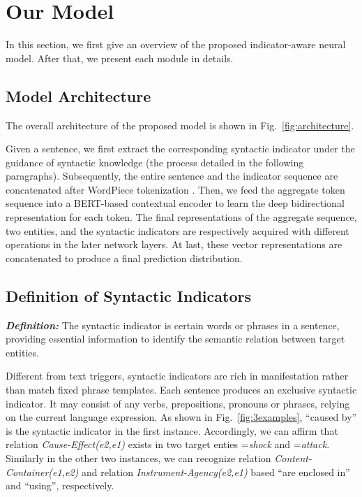 \documentclass[conference]{IEEEtran}
\begin{document}
\section{Our Model}

In this section, we first give an overview of the proposed indicator-aware neural model. After that, we present each module in details.

\subsection{Model Architecture}

The overall architecture of the proposed model is shown in Fig.~\ref{fig:architecture}. 

Given a sentence, we first extract the corresponding syntactic indicator under the guidance of syntactic knowledge (the process detailed in the following paragraphs). Subsequently, the entire sentence and the indicator sequence are concatenated after WordPiece tokenization \cite{sennrich2016neural}. Then, we feed the aggregate token sequence into a BERT-based contextual encoder to learn the deep bidirectional representation for each token. The final representations of the aggregate sequence, two entities, and the syntactic indicators are respectively acquired with different operations in the later network layers. At last, these vector representations are concatenated to produce a final prediction distribution.

\subsection{Definition of Syntactic Indicators}

{\bf \em Definition: }The syntactic indicator is certain words or phrases in a sentence, providing essential information to identify the semantic relation between target entities. 

Different from text triggers, syntactic indicators are rich in manifestation rather than match fixed phrase templates. Each sentence produces an exclusive syntactic indicator. It may consist of any verbs, prepositions, pronouns or phrases, relying on the current language expression. As shown in Fig.~\ref{fig:3examples}, “caused by” is the syntactic indicator in the first instance. Accordingly, we can affirm that relation {\em Cause-Effect(e2,e1)} exists in two target enties ={\em shock} and ={\em attack}. Similarly in the other two instances, we can recognize relation {\em Content-Container(e1,e2)} and relation {\em Instrument-Agency(e2,e1)} based “are enclosed in” and “using”, respectively.
\end{document}

